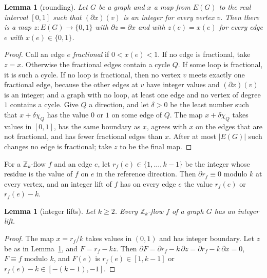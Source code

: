 \documentclass[11pt]{article}
\newtheorem{lemma}[theorem]{Lemma}
\theoremstyle{definition}
\newcommand{\Z}{\mathbb{Z}}
\begin{document}
\begin{lemma}[rounding]\label{lem:round}
Let $G$ be a graph and $x$ a map from $E(G)$ to the real interval $[0,1]$ such that $(\partial x)(v)$ is an integer
for every vertex $v$. Then there is a map $z\colon E(G)\to\{0,1\}$ with $\partial z=\partial x$ and with $z(e)=x(e)$
for every edge $e$ with $x(e)\in\{0,1\}$.
\end{lemma}
\begin{proof}
Call an edge $e$ \emph{fractional} if $0<x(e)<1$. If no edge is fractional, take $z=x$. Otherwise the fractional
edges contain a cycle $Q$. If some loop is fractional, it is such a cycle. If no loop is fractional, then no vertex $v$
meets exactly one fractional edge, because the other edges at $v$ have integer values and $(\partial x)(v)$ is an
integer; and a graph with no loop, at least one edge and no vertex of degree $1$ contains a cycle. Give $Q$ a direction, and
let $\delta>0$ be the least number such that $x+\delta\chi_Q$ has the value $0$ or $1$ on some edge of $Q$. The map
$x+\delta\chi_Q$ takes values in $[0,1]$, has the same boundary as $x$, agrees with $x$ on the edges that are not
fractional, and has fewer fractional edges than $x$. After at most $|E(G)|$ such changes no edge is fractional; take
$z$ to be the final map.
\end{proof}

For a $\Z_k$-flow $f$ and an edge $e$, let $r_f(e)\in\{1,\dots,k-1\}$ be the integer whose residue is the value of
$f$ on $e$ in the reference direction. Then $\partial r_f\equiv 0$ modulo $k$ at every vertex, and an integer lift of
$f$ has on every edge $e$ the value $r_f(e)$ or $r_f(e)-k$.

\begin{lemma}[integer lifts]\label{lem:lift}
Let $k\ge 2$. Every $\Z_k$-flow $f$ of a graph $G$ has an integer lift.
\end{lemma}
\begin{proof}
The map $x=r_f/k$ takes values in $(0,1)$ and has integer boundary. Let $z$ be as in Lemma~\ref{lem:round}, and
$F=r_f-kz$. Then $\partial F=\partial r_f-k\,\partial z=\partial r_f-k\,\partial x=0$, $F\equiv f$ modulo $k$, and
$F(e)$ is $r_f(e)\in[1,k-1]$ or $r_f(e)-k\in[-(k-1),-1]$.
\end{proof}
\end{document}
